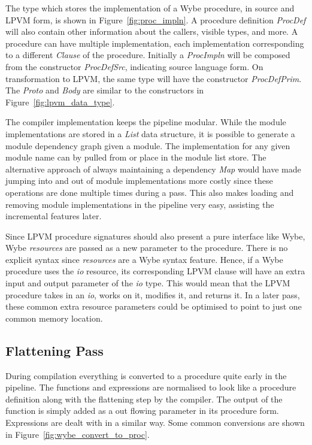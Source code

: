 The type which stores the implementation of a Wybe procedure, in source and
LPVM form, is shown in Figure~\ref{fig:proc_impln}. A procedure definition
\textit{ProcDef} will also contain other information about the callers, visible
types, and more. A procedure can have multiple implementation, each
implementation corresponding to a different \textit{Clause} of the
procedure. Initially a \textit{ProcImpln} will be composed from the constructor
\textit{ProcDefSrc}, indicating source language form. On transformation to
LPVM, the same type will have the constructor \textit{ProcDefPrim}. The
\textit{Proto} and \textit{Body} are similar to the constructors in
Figure~\ref{fig:lpvm_data_type}.

The compiler implementation keeps the pipeline modular. While the module
implementations are stored in a \textit{List} data structure, it is possible to
generate a module dependency graph given a module. The implementation for any
given module name can by pulled from or place in the module list store. The
alternative approach of always maintaining a dependency \textit{Map} would have
made jumping into and out of module implementations more costly since these
operations are done multiple times during a pass. This also makes loading and
removing module implementations in the pipeline very easy, assisting the
incremental features later.


Since LPVM procedure signatures should also present a pure interface like Wybe,
Wybe \textit{resources} are passed as a new parameter to the procedure. There
is no explicit syntax since \textit{resources} are a Wybe syntax
feature. Hence, if a Wybe procedure uses the \textit{io} resource, its
corresponding LPVM clause will have an extra input and output parameter of the
\textit{io} type. This would mean that the LPVM procedure takes in an
\textit{io}, works on it, modifies it, and returns it. In a later pass, these
common extra resource parameters could be optimised to point to just one common
memory location.


\subsection{Flattening Pass}

During compilation everything is converted to a procedure quite early
in the pipeline. The functions and expressions are normalised to look like a
procedure definition along with the flattening step by the compiler. The output
of the function is simply added as a out flowing parameter in its procedure
form. Expressions are dealt with in a similar way.  Some common conversions are
shown in Figure~\ref{fig:wybe_convert_to_proc}.

